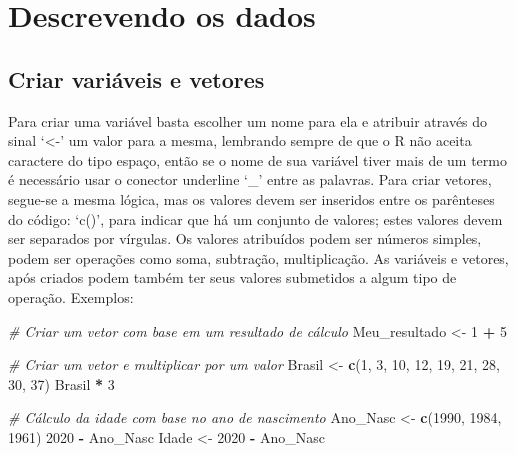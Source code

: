\documentclass[
  brazil,
]{book}
\newenvironment{Shaded}{\begin{snugshade}}{\end{snugshade}}
\newcommand{\CommentTok}[1]{\textcolor[rgb]{0.56,0.35,0.01}{\textit{#1}}}
\newcommand{\DecValTok}[1]{\textcolor[rgb]{0.00,0.00,0.81}{#1}}
\newcommand{\KeywordTok}[1]{\textcolor[rgb]{0.13,0.29,0.53}{\textbf{#1}}}
\newcommand{\NormalTok}[1]{#1}
\newcommand{\OperatorTok}[1]{\textcolor[rgb]{0.81,0.36,0.00}{\textbf{#1}}}
\newcommand{\StringTok}[1]{\textcolor[rgb]{0.31,0.60,0.02}{#1}}
\begin{document}
\hypertarget{descrevendo-os-dados}{%
\section{Descrevendo os dados}\label{descrevendo-os-dados}}

\hypertarget{criar-variuxe1veis-e-vetores}{%
\subsection{Criar variáveis e vetores}\label{criar-variuxe1veis-e-vetores}}

Para criar uma variável basta escolher um nome para ela e atribuir através do sinal `\textless-' um valor para a mesma, lembrando sempre de que o R não aceita caractere do tipo espaço, então se o nome de sua variável tiver mais de um termo é necessário usar o conector underline `\_' entre as palavras. Para criar vetores, segue-se a mesma lógica, mas os valores devem ser inseridos entre os parênteses do código: `c()', para indicar que há um conjunto de valores; estes valores devem ser separados por vírgulas. Os valores atribuídos podem ser números simples, podem ser operações como soma, subtração, multiplicação. As variáveis e vetores, após criados podem também ter seus valores submetidos a algum tipo de operação. Exemplos:

\begin{Shaded}
\begin{Highlighting}[]
\CommentTok{# Criar um vetor com base em um resultado de cálculo}
\NormalTok{Meu_resultado <-}\StringTok{ }\DecValTok{1} \OperatorTok{+}\StringTok{ }\DecValTok{5}

\CommentTok{# Criar um vetor e multiplicar por um valor}
\NormalTok{Brasil <-}\StringTok{ }\KeywordTok{c}\NormalTok{(}\DecValTok{1}\NormalTok{, }\DecValTok{3}\NormalTok{, }\DecValTok{10}\NormalTok{, }\DecValTok{12}\NormalTok{, }\DecValTok{19}\NormalTok{, }\DecValTok{21}\NormalTok{, }\DecValTok{28}\NormalTok{, }\DecValTok{30}\NormalTok{, }\DecValTok{37}\NormalTok{)}
\NormalTok{Brasil }\OperatorTok{*}\StringTok{ }\DecValTok{3}

\CommentTok{# Cálculo da idade com base no ano de nascimento}
\NormalTok{Ano_Nasc <-}\StringTok{ }\KeywordTok{c}\NormalTok{(}\DecValTok{1990}\NormalTok{, }\DecValTok{1984}\NormalTok{, }\DecValTok{1961}\NormalTok{)}
\DecValTok{2020} \OperatorTok{-}\StringTok{ }\NormalTok{Ano_Nasc}
\NormalTok{Idade <-}\StringTok{ }\DecValTok{2020} \OperatorTok{-}\StringTok{ }\NormalTok{Ano_Nasc}
\end{Highlighting}
\end{Shaded}
\end{document}
